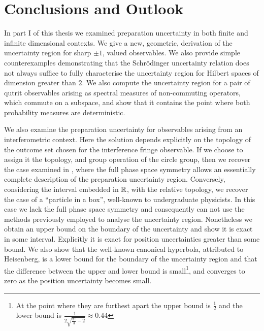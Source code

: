 \let\textcircled=\pgftextcircled
\chapter{Conclusions and Outlook} \label{chap:conclusion}


In part I of this thesis we examined preparation uncertainty in both finite and infinite dimensional contexts. We give a new, geometric, derivation of the uncertainty region for sharp $\pm 1$, valued observables. We also provide simple counterexamples demonstrating that the Schr{\"o}dinger uncertainty relation does not always suffice to fully characterise the uncertainty region for Hilbert spaces of dimension greater than $2$. We also compute the uncertainty region for a pair of qutrit observables arising as spectral measures of non-commuting operators, which commute on a subspace, and show that it contains the point where both probability measures are deterministic.

We also examine the preparation uncertainty for observables arising from an interferometric context. Here the solution depends explicitly on the topology of the outcome set chosen for the interference fringe observable. If we choose to assign it the topology, and group operation of the circle group, then we recover the case examined in \cite{sharp-ur-num-angle}, where the full phase space symmetry allows an essentially complete description of the preparation uncertainty region. Conversely, considering the interval embedded in $\mathbb{R}$, with the relative topology, we recover the case of a ``particle in a box'', well-known to undergraduate physicists. In this case we lack the full phase space symmetry and consequently can not use the methods previously employed to analyse the uncertainty region. Nonetheless we obtain an upper bound on the boundary of the uncertainty and show it is exact in some interval. Explicitly it is exact for position uncertainties greater than some bound. We also show that the well-known canonical hyperbola, attributed to Heisenberg, is a lower bound for the boundary of the uncertainty region and that the difference between the upper and lower bound is small\footnote{At the point where they are furthest apart the upper bound is $\frac{1}{2}$ and the lower bound is $\frac{1}{2\sqrt{\frac{\pi^2}{3} -2}}\approx 0.44$}, and converges to zero as the position uncertainty becomes small. 

